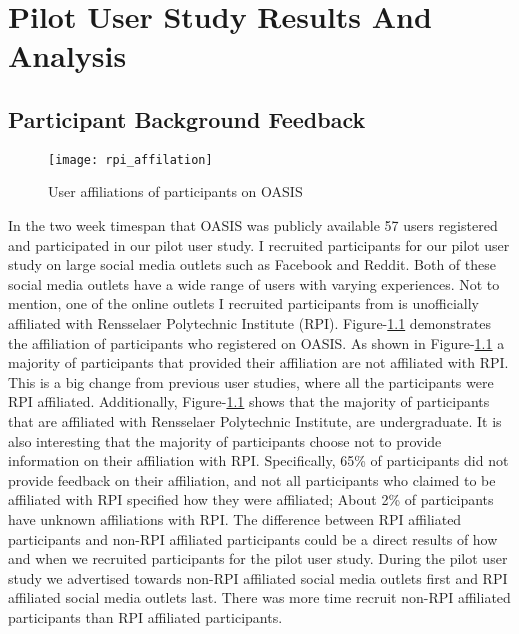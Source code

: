 \chapter{Pilot User Study Results And Analysis} \label{sec:results}

\section{Participant Background Feedback}

\begin{figure}[h]
	\centering
	\texttt{[image: rpi\_affilation]}
	\caption{User affiliations of participants on OASIS}
	\label{fig:rpi_affilation}
\end{figure}

In the two week timespan that OASIS was publicly available 57 users registered and participated in our pilot user study.
I recruited participants for our pilot user study on large social media outlets such as Facebook and Reddit.
Both of these social media outlets have a wide range of users with varying experiences.
Not to mention, one of the online outlets I recruited participants from is unofficially affiliated with Rensselaer Polytechnic Institute (RPI). 
Figure-\ref{fig:rpi_affilation} demonstrates the affiliation of participants who registered on OASIS.
As shown in Figure-\ref{fig:rpi_affilation} a majority of participants that provided their affiliation are not affiliated with RPI. 
This is a big change from previous user studies, where all the participants were RPI affiliated.
Additionally, Figure-\ref{fig:rpi_affilation} shows that the majority of participants that are affiliated with Rensselaer Polytechnic Institute, are undergraduate.
It is also interesting that the majority of participants choose not to provide information on their affiliation with RPI.
Specifically, 65\% of participants did not provide feedback on their affiliation, and not all participants who claimed to be affiliated with RPI specified how they were affiliated;
About 2\% of participants have unknown affiliations with RPI.
The difference between RPI affiliated participants and non-RPI affiliated participants could be a direct results of how and when we recruited participants for the pilot user study.
During the pilot user study we advertised towards non-RPI affiliated social media outlets first and  RPI affiliated social media outlets last. 
There was more time recruit non-RPI affiliated participants than RPI affiliated participants. \\

